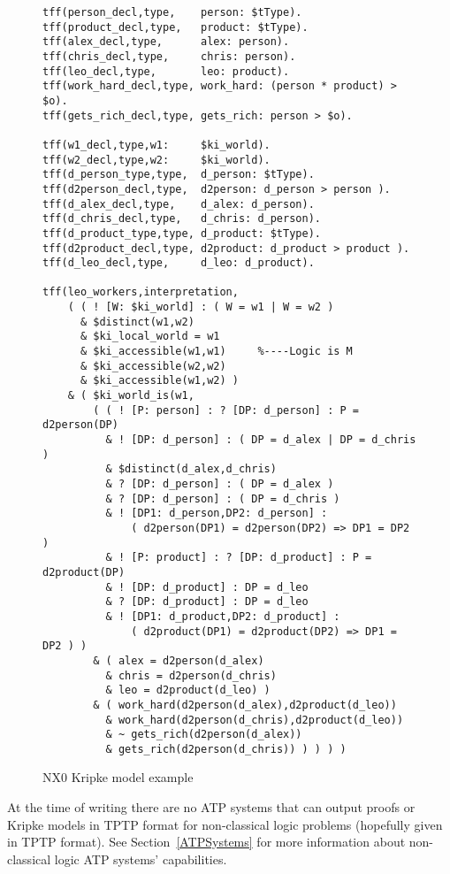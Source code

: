 \documentclass[runningheads]{llncs}
\begin{document}
\begin{figure}[htbp]
\small
{}
\begin{verbatim}
tff(person_decl,type,    person: $tType).
tff(product_decl,type,   product: $tType).
tff(alex_decl,type,      alex: person).
tff(chris_decl,type,     chris: person).
tff(leo_decl,type,       leo: product).
tff(work_hard_decl,type, work_hard: (person * product) > $o).
tff(gets_rich_decl,type, gets_rich: person > $o).

tff(w1_decl,type,w1:     $ki_world).
tff(w2_decl,type,w2:     $ki_world).
tff(d_person_type,type,  d_person: $tType).
tff(d2person_decl,type,  d2person: d_person > person ).
tff(d_alex_decl,type,    d_alex: d_person).
tff(d_chris_decl,type,   d_chris: d_person).
tff(d_product_type,type, d_product: $tType).
tff(d2product_decl,type, d2product: d_product > product ).
tff(d_leo_decl,type,     d_leo: d_product).

tff(leo_workers,interpretation,
    ( ( ! [W: $ki_world] : ( W = w1 | W = w2 )
      & $distinct(w1,w2)
      & $ki_local_world = w1
      & $ki_accessible(w1,w1)     %----Logic is M
      & $ki_accessible(w2,w2)
      & $ki_accessible(w1,w2) )
    & ( $ki_world_is(w1,
        ( ( ! [P: person] : ? [DP: d_person] : P = d2person(DP)
          & ! [DP: d_person] : ( DP = d_alex | DP = d_chris )
          & $distinct(d_alex,d_chris)
          & ? [DP: d_person] : ( DP = d_alex )
          & ? [DP: d_person] : ( DP = d_chris )
          & ! [DP1: d_person,DP2: d_person] : 
              ( d2person(DP1) = d2person(DP2) => DP1 = DP2 )
          & ! [P: product] : ? [DP: d_product] : P = d2product(DP)
          & ! [DP: d_product] : DP = d_leo
          & ? [DP: d_product] : DP = d_leo
          & ! [DP1: d_product,DP2: d_product] :
              ( d2product(DP1) = d2product(DP2) => DP1 = DP2 ) )
        & ( alex = d2person(d_alex)
          & chris = d2person(d_chris)
          & leo = d2product(d_leo) )
        & ( work_hard(d2person(d_alex),d2product(d_leo))
          & work_hard(d2person(d_chris),d2product(d_leo))
          & ~ gets_rich(d2person(d_alex))
          & gets_rich(d2person(d_chris)) ) ) ) )
\end{verbatim}
\caption{NX0 Kripke model example}
\label{NX0Kripke}
\end{figure}
At the time of writing there are no ATP systems that can output proofs or Kripke models
in TPTP format for non-classical logic problems (hopefully given in TPTP format).
See Section~\ref{ATPSystems} for more information about non-classical logic ATP systems' 
capabilities.
\end{document}

